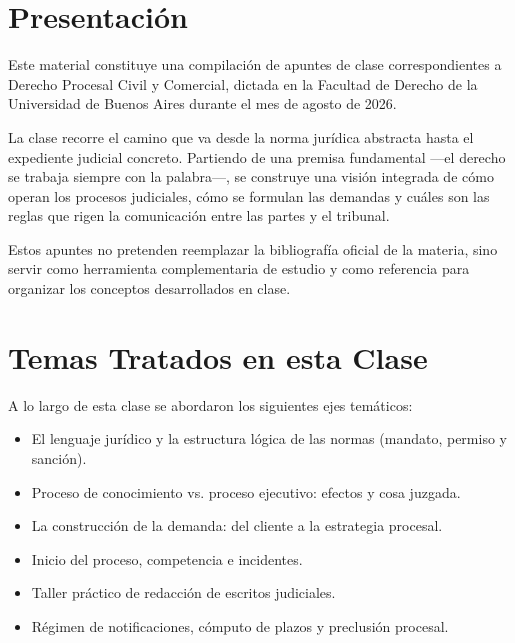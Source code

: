 \documentclass[12pt,oneside]{book}
\begin{document}

\tableofcontents


\chapter*{Presentación}

Este material constituye una compilación de apuntes de clase correspondientes a Derecho Procesal Civil y Comercial, dictada en la Facultad de Derecho de la Universidad de Buenos Aires durante el mes de agosto de 2026.

La clase recorre el camino que va desde la norma jurídica abstracta hasta el expediente judicial concreto. Partiendo de una premisa fundamental ---el derecho se trabaja siempre con la palabra---, se construye una visión integrada de cómo operan los procesos judiciales, cómo se formulan las demandas y cuáles son las reglas que rigen la comunicación entre las partes y el tribunal.

Estos apuntes no pretenden reemplazar la bibliografía oficial de la materia, sino servir como herramienta complementaria de estudio y como referencia para organizar los conceptos desarrollados en clase.


\chapter*{Temas Tratados en esta Clase}

A lo largo de esta clase se abordaron los siguientes ejes temáticos:

\begin{itemize}
    \item El lenguaje jurídico y la estructura lógica de las normas (mandato, permiso y sanción).
    \item Proceso de conocimiento vs. proceso ejecutivo: efectos y cosa juzgada.
    \item La construcción de la demanda: del cliente a la estrategia procesal.
    \item Inicio del proceso, competencia e incidentes.
    \item Taller práctico de redacción de escritos judiciales.
    \item Régimen de notificaciones, cómputo de plazos y preclusión procesal.
\end{itemize}
\end{document}
